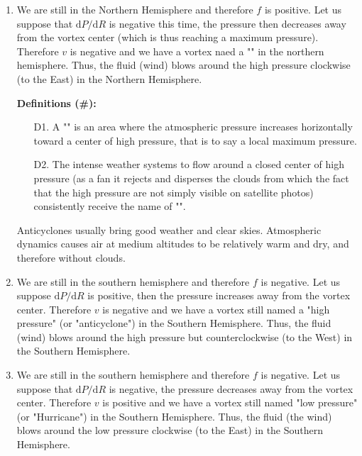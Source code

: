 \begin{enumerate}
		\item We are still in the Northern Hemisphere and therefore $f$ is positive. Let us suppose that $\mathrm{d}P / \mathrm{d}R$ is negative this time, the pressure then decreases away from the vortex center (which is thus reaching a maximum pressure). Therefore $v$ is negative and we have a vortex naed a "" in the northern hemisphere. Thus, the fluid (wind) blows around the high pressure clockwise (to the East) in the Northern Hemisphere.

		\textbf{Definitions (\#\mydef):} 
		\begin{enumerate}
			\item[D1.] A "" is an area where the atmospheric pressure increases horizontally toward a center of high pressure, that is to say a local maximum pressure.
	
			\item[D2.] The intense weather systems to flow around a closed center of high pressure (as a fan it rejects and disperses the clouds from which the fact that the high pressure are not simply visible on satellite photos) consistently receive the name of "".
		\end{enumerate}
		\begin{tcolorbox}[title=Remark,colframe=black,arc=10pt]
		Anticyclones usually bring good weather and clear skies. Atmospheric dynamics causes air at medium altitudes to be relatively warm and dry, and therefore without clouds.
		\end{tcolorbox}

		\item We are still in the southern hemisphere and therefore $f$ is negative. Let us suppose $\mathrm{d}P /\mathrm{d}R$ is positive, then the pressure increases away from the vortex center. Therefore $v$ is negative and we have a vortex still named a "high pressure" (or "anticyclone") in the Southern Hemisphere. Thus, the fluid (wind) blows around the high pressure but counterclockwise (to the West) in the Southern Hemisphere.

		\item We are still in the southern hemisphere and therefore $f$ is negative. Let us suppose that $\mathrm{d}P/\mathrm{d}R$ is negative, the pressure decreases away from the vortex center. Therefore $v$ is positive and we have a vortex still named "low pressure" (or "Hurricane") in the Southern Hemisphere. Thus, the fluid (the wind) blows around the low pressure clockwise (to the East) in the Southern Hemisphere.
	\end{enumerate}
